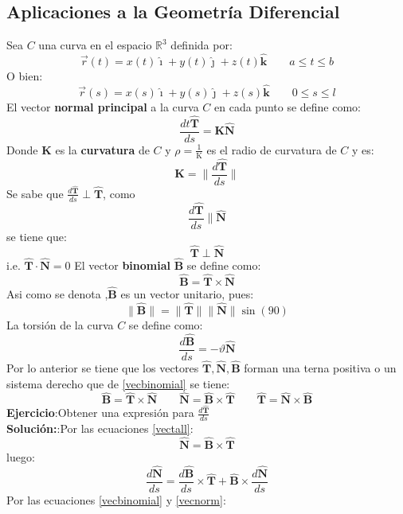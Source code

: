 \documentclass[a4paper]{article}
\newcommand{\ihat}{\boldsymbol{\hat{\imath}}}
\newcommand{\jhat}{\boldsymbol{\hat{\jmath}}}
\newcommand{\khat}{\boldsymbol{\hat{\bm{k}}}}
\begin{document}
\subsection{Aplicaciones a la Geometría Diferencial}
Sea $C$ una curva en el espacio $\mathbb{R}^3$ definida por:
\[\vec{r}(t)=x(t)\ihat+y(t)\jhat+z(t)\khat \qquad a\leq t\leq b\]
O bien:
\[\vec{r}(s)=x(s)\ihat+y(s)\jhat+z(s)\khat \qquad 0\leq s\leq l\]
El vector \textbf{normal principal} a la curva $C$ en cada punto se define como:
\begin{equation}
\label{vecnorm}
\frac{dt\mathbf{\hat{T}}}{ds}=\mathbf{K}\mathbf{\hat{N}}
\end{equation}
Donde $\mathbf{K}$ es la \textbf{curvatura} de $C$ y $\rho=\frac{1}{\mathrm{K}}$ es el radio de curvatura de $C$ y es:
\[\mathbf{K}=\Big\lVert \frac{d\mathbf{\hat{T}}}{ds}\Big\rVert\]
Se sabe que $\frac{d\mathbf{\hat{T}}}{ds}\perp\mathbf{\hat{T}}$, como
\[\frac{d\mathbf{\hat{T}}}{ds}\parallel\mathbf{\hat{N}}\]
se tiene que:
\[\mathbf{\hat{T}}\perp\mathbf{\hat{N}}\]
i.e. $\mathbf{\hat{T}}\cdot\mathbf{\hat{N}}=0$
El vector \textbf{binomial} $\mathbf{\hat{B}}$ se define como:
\begin{equation}
\label{vecbinomial}
\mathbf{\hat{B}}=\mathbf{\hat{T}}\times\mathbf{\hat{N}}
\end{equation}
Asi como se denota ,$\mathbf{\hat{B}}$ es un vector unitario, pues:
\[\lVert \mathbf{\hat{B}} \rVert=\lVert \mathbf{\hat{T}} \rVert\lVert \mathbf{\hat{N}} \rVert\sin(90)\]
La torsión de la curva $C$ se define como:
\begin{equation}
 \frac{d\mathbf{\hat{B}}}{ds}=-\vartheta\mathbf{\hat{N}}
\end{equation}
Por lo anterior se tiene que los vectores $\mathbf{\hat{T}},\mathbf{\hat{N}},\mathbf{\hat{B}}$ forman una terna positiva o un sistema derecho que de \ref{vecbinomial} se tiene:
\begin{equation}
\label{vectall}
\mathbf{\hat{B}}=\mathbf{\hat{T}}\times\mathbf{\hat{N}}\qquad\mathbf{\hat{N}}=\mathbf{\hat{B}}\times\mathbf{\hat{T}}\qquad\mathbf{\hat{T}}=\mathbf{\hat{N}}\times\mathbf{\hat{B}}
\end{equation}
\textbf{Ejercicio}:Obtener una expresión para $\frac{d\mathbf{\hat{T}}}{ds}$\\[2ex]
\textbf{Solución:}:Por las ecuaciones \ref{vectall}:
\[\mathbf{\hat{N}}=\mathbf{\hat{B}}\times\mathbf{\hat{T}}\]
luego:
\[\frac{d\mathbf{\hat{N}}}{ds}=\frac{d\mathbf{\hat{B}}}{ds}\times\mathbf{\hat{T}}+\mathbf{\hat{B}}\times\frac{d\mathbf{\hat{N}}}{ds}\]
Por las ecuaciones \ref{vecbinomial} y \ref{vecnorm}:
\end{document}

